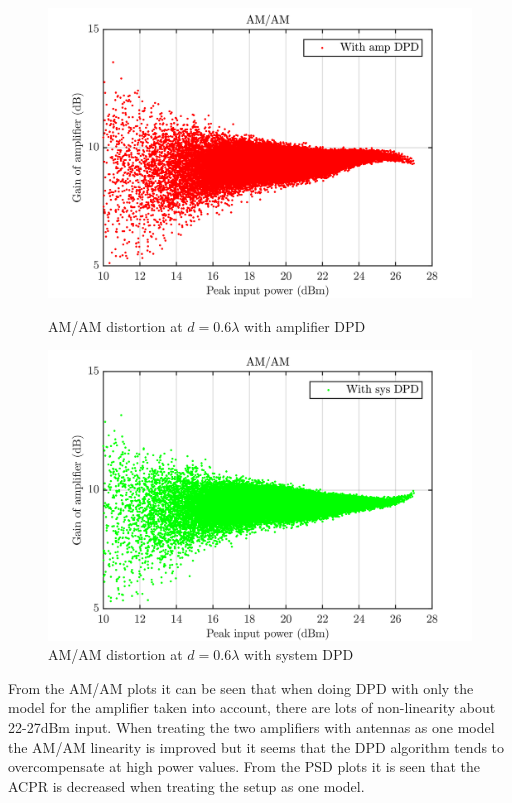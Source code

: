 \begin{figure}[H]
  \centering
  \begin{minipage}[b]{0.5\textwidth}
	\includegraphics[scale = 0.5]{figures/measurement/cree/meas3/amam_amp_dpd_0p6.png}
	\caption{AM/AM distortion at $d = 0.6\lambda$ with amplifier DPD}	
    \label{fig:meas3_amam5_3}
  \end{minipage}
  \hfill
  \begin{minipage}[b]{0.4\textwidth}
	\includegraphics[scale = 0.5]{figures/measurement/cree/meas3/amam_sys_dpd_0p6.png}
	\caption{AM/AM distortion at $d = 0.6\lambda$ with system DPD}
    \label{fig:meas3_amam6_3}
  \end{minipage}
\end{figure}

From the AM/AM plots it can be seen that when doing DPD with only the model for the amplifier taken into account,  there are lots of non-linearity about 22-27dBm input. When treating the two amplifiers with antennas as one model the AM/AM linearity is improved but it seems that the DPD algorithm tends to overcompensate at high power values. From the PSD plots it is seen that the ACPR is decreased when treating the setup as one model. 


